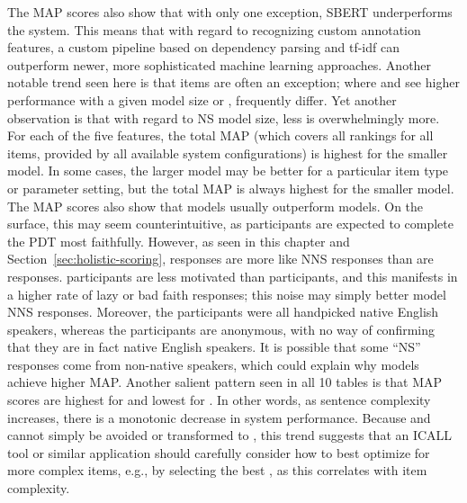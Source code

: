 The MAP scores also show that with only one exception, SBERT underperforms the system. 
This means that with regard to recognizing custom annotation features, a custom pipeline based on dependency parsing and tf-idf can outperform newer, more sophisticated machine learning approaches.  Another notable trend seen here is that  items are often an exception; where  and  see higher performance with a given model size or ,  frequently differ. Yet another observation is that with regard to NS model size, less is overwhelmingly more. For each of the five features, the total MAP (which covers all rankings for all items, provided by all available system configurations) is highest for the smaller model. In some cases, the larger model may be better for a particular item type or parameter setting, but the total MAP is always highest for the smaller model. The MAP scores also show that  models usually outperform  models. On the surface, this may seem counterintuitive, as  participants are expected to complete the PDT most faithfully. However, as seen in this chapter and Section~\ref{sec:holistic-scoring},  responses are more like NNS responses than are  responses.  participants are less motivated than  participants, and this manifests in a higher rate of lazy or bad faith responses; this noise may simply better model NNS responses. Moreover, the  participants were all handpicked native English speakers, whereas the  participants are anonymous, with no way of confirming that they are in fact native English speakers. It is possible that some ``NS'' responses come from non-native speakers, which could explain why  models achieve higher MAP.
Another salient pattern seen in all 10 tables is that MAP scores are highest for  and lowest for . In other words, as sentence complexity increases, there is a monotonic decrease in system performance. Because  and  cannot simply be avoided or transformed to , this trend suggests that an ICALL tool or similar application should carefully consider how to best optimize for more complex items, e.g., by selecting the best , as this correlates with item complexity.

